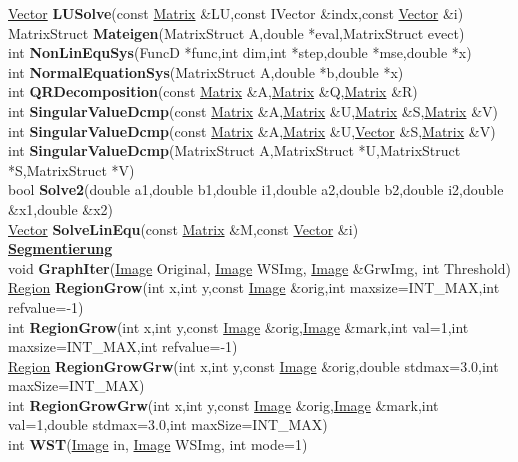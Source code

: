 \documentclass[10pt,titlepage]{article}
\newcommand{\subtitle}[1]{{\noindent\bf#1}}
\def\functionlistentry#1#2#3#4#5#6{\noindent #1 {\bf #2}(#3) \dotfill #6\\}
\begin{document}
{{\functionlistentry{\hyperlink{Vector}{Vector}}{LUSolve}{const \hyperlink{Matrix}{Matrix} \&LU,const IVector \&indx,const \hyperlink{Vector}{Vector} \&i}{1123}{matrixAlgebra}{}
\functionlistentry{MatrixStruct}{Mateigen}{MatrixStruct A,double *eval,MatrixStruct evect}{1134}{matrixAlgebra}{}
\functionlistentry{int}{NonLinEquSys}{FuncD *func,int dim,int *step,double *mse,double *x}{1127}{matrixAlgebra}{}
\functionlistentry{int}{NormalEquationSys}{MatrixStruct A,double *b,double *x}{1126}{matrixAlgebra}{}
\functionlistentry{int}{QRDecomposition}{const \hyperlink{Matrix}{Matrix} \&A,\hyperlink{Matrix}{Matrix} \&Q,\hyperlink{Matrix}{Matrix} \&R}{1133}{matrixAlgebra}{}
\functionlistentry{int}{SingularValueDcmp}{const \hyperlink{Matrix}{Matrix} \&A,\hyperlink{Matrix}{Matrix} \&U,\hyperlink{Matrix}{Matrix} \&S,\hyperlink{Matrix}{Matrix} \&V}{1131}{matrixAlgebra}{}
\functionlistentry{int}{SingularValueDcmp}{const \hyperlink{Matrix}{Matrix} \&A,\hyperlink{Matrix}{Matrix} \&U,\hyperlink{Vector}{Vector} \&S,\hyperlink{Matrix}{Matrix} \&V}{1132}{matrixAlgebra}{}
\functionlistentry{int}{SingularValueDcmp}{MatrixStruct A,MatrixStruct *U,MatrixStruct *S,MatrixStruct *V}{1135}{matrixAlgebra}{}
\functionlistentry{bool}{Solve2}{double a1,double b1,double i1,double a2,double b2,double i2,double \&x1,double \&x2}{1124}{matrixAlgebra}{}
\functionlistentry{\hyperlink{Vector}{Vector}}{SolveLinEqu}{const \hyperlink{Matrix}{Matrix} \&M,const \hyperlink{Vector}{Vector} \&i}{1120}{matrixAlgebra}{}

\subtitle{\hyperlink{SECTION:segmentation}{Segmentierung}}\\
\functionlistentry{void}{GraphIter}{\hyperlink{Image}{Image} Original, \hyperlink{Image}{Image} WSImg, \hyperlink{Image}{Image} \&GrwImg, int Threshold}{1144}{segmentation}{}
\functionlistentry{\hyperlink{Region}{Region}}{RegionGrow}{int x,int y,const \hyperlink{Image}{Image} \&orig,int maxsize=INT\_MAX,int refvalue=-1}{1145}{segmentation}{}
\functionlistentry{int}{RegionGrow}{int x,int y,const \hyperlink{Image}{Image} \&orig,\hyperlink{Image}{Image} \&mark,int val=1,int maxsize=INT\_MAX,int refvalue=-1}{1146}{segmentation}{}
\functionlistentry{\hyperlink{Region}{Region}}{RegionGrowGrw}{int x,int y,const \hyperlink{Image}{Image} \&orig,double stdmax=3.0,int maxSize=INT\_MAX}{1147}{segmentation}{}
\functionlistentry{int}{RegionGrowGrw}{int x,int y,const \hyperlink{Image}{Image} \&orig,\hyperlink{Image}{Image} \&mark,int val=1,double stdmax=3.0,int maxSize=INT\_MAX}{1148}{segmentation}{}
\functionlistentry{int}{WST}{\hyperlink{Image}{Image} in, \hyperlink{Image}{Image} WSImg, int mode=1}{1143}{segmentation}{}

}}
\end{document}
